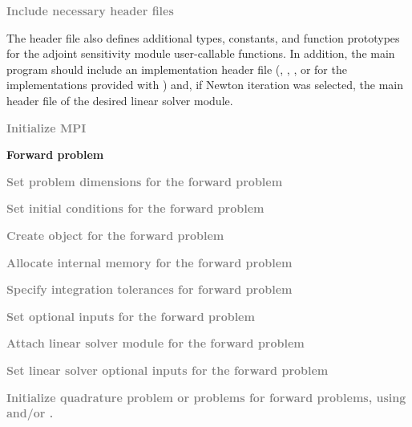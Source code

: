 \begin{Steps}

\item
  \textcolor{gray}{\bf Include necessary header files}
  
  The  header file also defines additional types, constants, and
  function prototypes for the adjoint sensitivity module user-callable functions.
  In addition, the main program should include an {\nvector} 
  implementation header file (,
  , , or 
  for the implementations provided with {\cvodes}) and, if Newton iteration 
  was selected, the main header file of the desired linear solver module.

\item
  \textcolor{gray}{\bf {\p} Initialize MPI}

  \vspace{0.2in}\centerline{\bf Forward problem}

\item
  \textcolor{gray}{\bf Set problem dimensions for the forward problem}

\item
  \textcolor{gray}{\bf Set initial conditions for the forward problem}

\item
  \textcolor{gray}{\bf Create {\cvodes} object for the forward problem}

\item
  \textcolor{gray}{\bf Allocate internal memory for the forward problem}

\item
  \textcolor{gray}{\bf Specify integration tolerances for forward problem}

\item
  \textcolor{gray}{\bf Set optional inputs for the forward problem}

\item
  \textcolor{gray}{\bf Attach linear solver module for the forward problem}

\item
  \textcolor{gray}{\bf Set linear solver optional inputs for the forward problem}

\item
  \textcolor{gray}{\bf Initialize quadrature problem or problems for forward
    problems, using  and/or .}


\end{Steps}
